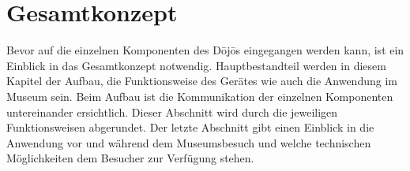 \section{Gesamtkonzept}\label{sec:gesamtkonzept}
Bevor auf die einzelnen Komponenten des Dōjōs eingegangen werden kann, ist ein Einblick in das Gesamtkonzept notwendig. Hauptbestandteil werden in diesem Kapitel der Aufbau, die Funktionsweise des Gerätes wie auch die Anwendung im Museum sein. Beim Aufbau ist die Kommunikation der einzelnen Komponenten untereinander ersichtlich. Dieser Abschnitt wird durch die jeweiligen Funktionsweisen abgerundet. Der letzte Abschnitt gibt einen Einblick in die Anwendung vor und während dem Museumsbesuch und welche technischen Möglichkeiten dem Besucher zur Verfügung stehen.